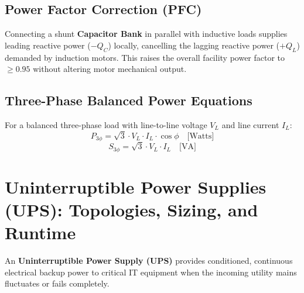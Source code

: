 \subsection{Power Factor Correction (PFC)}
Connecting a shunt \textbf{Capacitor Bank} in parallel with inductive loads supplies leading reactive power ($-Q_C$) locally, cancelling the lagging reactive power ($+Q_L$) demanded by induction motors. This raises the overall facility power factor to $\ge 0.95$ without altering motor mechanical output.

\subsection{Three-Phase Balanced Power Equations}
For a balanced three-phase load with line-to-line voltage $V_L$ and line current $I_L$:
\begin{equation}
\label{eq:three_phase_real}
\boxed{P_{3\phi} = \sqrt{3} \cdot V_L \cdot I_L \cdot \cos\phi \quad \text{[Watts]}}
\end{equation}
\begin{equation}
\label{eq:three_phase_apparent}
\boxed{S_{3\phi} = \sqrt{3} \cdot V_L \cdot I_L \quad \text{[VA]}}
\end{equation}


\section{Uninterruptible Power Supplies (UPS): Topologies, Sizing, and Runtime}
\label{sec:ups_systems}

An \textbf{Uninterruptible Power Supply (UPS)} provides conditioned, continuous electrical backup power to critical IT equipment when the incoming utility mains fluctuates or fails completely.

